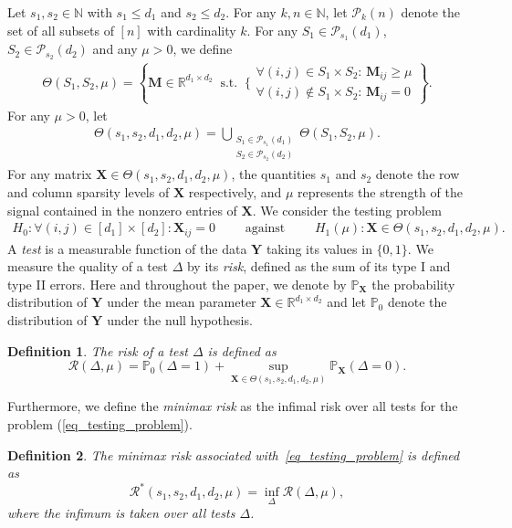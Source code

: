 \documentclass{article}
\newcommand{\R}{\mathbb{R}}
\newcommand{\X}{\mathbf{X}}
\newcommand{\Y}{\mathbf{Y}}
\newcommand{\cR}{\mathcal{R}}
\newtheorem{definition}{Definition}
\theoremstyle{remark}
\begin{document}
Let $s_1, s_2 \in \mathbb N$ with $s_1 \leq d_1$ and $s_2 \leq d_2$. For any $k,n \in \mathbb N$, let $\mathcal{P}_k(n)$ denote the set of all subsets of $[n]$ with cardinality $k$.
For any $S_1 \in \mathcal{P}_{s_1}(d_1)$, $S_2 \in \mathcal{P}_{s_2}(d_2)$ and any $\mu > 0$, we define
\begin{align*}
    \Theta(S_1, S_2, \mu) = \left\{\mathbf M \in \R^{d_1\times d_2} ~\text{ s.t. }~ \Bigg\{\begin{array}{ll}
        \!\forall (i,j) \in S_1\!\times\! S_2: \, \mathbf M_{ij} \geq \mu\\
        \!\forall (i,j) \notin S_1\!\times\! S_2: \, \mathbf M_{ij} = 0
    \end{array}
    \right\}.
\end{align*}
For any $\mu>0$, let 
\begin{align*}
    \Theta(s_1,s_2, d_1, d_2, \mu) = \bigcup_{\substack{S_1 \in \mathcal{P}_{s_1}(d_1)\\ S_2 \in \mathcal{P}_{s_2}(d_2)}} \Theta(S_1, S_2, \mu).
\end{align*}
For any matrix $\X \in \Theta(s_1,s_2, d_1, d_2, \mu)$, the quantities $s_1$ and $s_2$ denote the row and column sparsity levels of $\mathbf{X}$ respectively, and $\mu$ represents the strength of the signal contained in the nonzero entries of $\X$. We consider the testing problem
\begin{align}
    H_0: \forall (i,j) \in [d_1]\times [d_2]: \X_{ij} =  0 \qquad \text{ against } \qquad  H_1(\mu) : \X \in \Theta(s_1,s_2, d_1, d_2, \mu).\label{eq_testing_problem}
\end{align}
A \textit{test} is a measurable function of the data $\Y$ taking its values in $\{0,1\}$. We measure the quality of a test $\Delta$ by its \textit{risk}, defined as the sum of its type I and type II errors.  Here and throughout the paper, we denote by $\mathbb P_\X$ the probability distribution of $\Y$ under the mean parameter $\X \in \R^{d_1 \times d_2}$ and let $\mathbb P_{0}$ denote the distribution of $\Y$ under the null hypothesis.

\begin{definition}
     The risk of a test $\Delta$ is defined as
\begin{equation}\label{eq_testing_risk}
    \cR(\Delta, \mu) = \mathbb P_{0}(\Delta = 1) + \sup_{\X \in \Theta(s_1,s_2,d_1,d_2, \mu)} \mathbb P_\X(\Delta = 0).
\end{equation}
\end{definition}
\noindent Furthermore, we define the \textit{minimax risk} as the infimal risk over all tests for the problem (\ref{eq_testing_problem}).
\begin{definition}
    The \textit{minimax risk} associated with~\eqref{eq_testing_problem} is defined as
\begin{equation}\label{eq_minimax_risk}
    \cR^*(s_1,s_2,d_1,d_2, \mu) = \inf_{\Delta} \cR(\Delta, \mu),
\end{equation}
where the infimum is taken over all tests $\Delta$.
\end{definition} 
\end{document}
